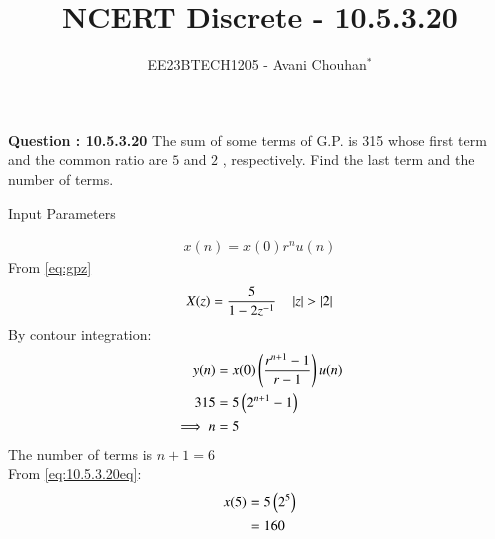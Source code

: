 \documentclass[journal,12pt,twocolumn]{IEEEtran}
\theoremstyle{remark}
\begin{document}

\vspace{3cm}

\title{NCERT Discrete - 10.5.3.20}
\author{EE23BTECH1205 - Avani Chouhan$^{*}$%
}
\maketitle
\newpage
\bigskip

\renewcommand{\thefigure}{\theenumi}
\renewcommand{\thetable}{\theenumi}

\vspace{3cm}
\textbf{Question : 10.5.3.20} 
The sum of some terms of G.P. is 315 whose first term and the common ratio are $5$ and $2$ , respectively. Find the last term and the number of terms.\\
\solution

\begin{table}
  \centering
  
  
  \caption{Input Parameters}
  \label{tab:10.5.3.20table1}
\end{table}
\begin{align}
x(n) = x(0)r^{n}u(n)
\label{eq:10.5.3.20eq}
\end{align}
From \eqref{eq:gpz}
\begin{align}
X(z) =\frac{5}{1-2z^{-1}} \quad \left\vert z\right\vert > \left\vert2\right\vert
\end{align}
By contour integration:
\begin{align}
y(n) &= x(0)\left(\frac{r^{n+1}-1}{r-1}\right)u(n)\\
315 &= 5\left(2^{n+1}- 1\right)  \\
\implies n &= 5
\end{align}
The number of terms is \(n + 1 = 6\)\\
From \eqref{eq:10.5.3.20eq}:
\begin{align}
x(5) &= 5\left(2^{5}\right)\\
 &= 160 
\end{align}
\end{document}
